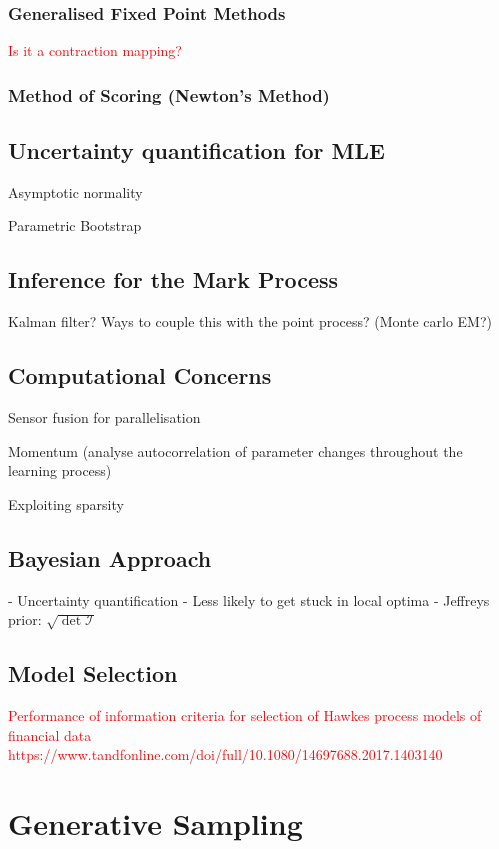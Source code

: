 \documentclass[honours,12pt]{unswthesis}
\numberwithin{equation}{section}
\begin{document}
\subsection{Generalised Fixed Point Methods}
\textcolor{red}{Is it a contraction mapping?}

\subsection{Method of Scoring (Newton's Method)}

\section{Uncertainty quantification for MLE}
Asymptotic normality

Parametric Bootstrap

\section{Inference for the Mark Process}
Kalman filter? Ways to couple this with the point process? (Monte carlo EM?)

\section{Computational Concerns}
Sensor fusion for parallelisation

Momentum (analyse autocorrelation of parameter changes throughout the learning process)

Exploiting sparsity \cite{NickelLe}

\section{Bayesian Approach}
- Uncertainty quantification
- Less likely to get stuck in local optima
- Jeffreys prior: $\sqrt{\det \mathcal{I}}$

\section{Model Selection}

\textcolor{red}{Performance of information criteria for selection of Hawkes process models of financial data https://www.tandfonline.com/doi/full/10.1080/14697688.2017.1403140}

\chapter{Generative Sampling}
\end{document}
